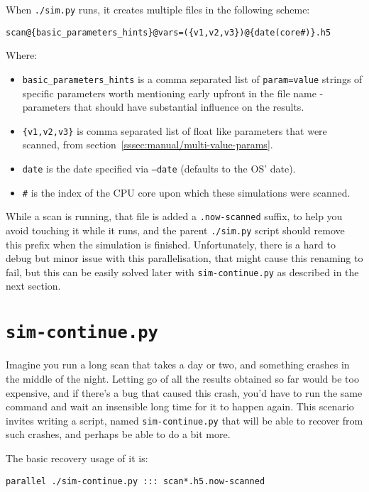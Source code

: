 When \texttt{./sim.py} runs, it creates multiple files in the following scheme:
	
\begin{verbatim}
scan@{basic_parameters_hints}@vars=({v1,v2,v3})@{date(core#)}.h5
\end{verbatim}

Where:

\begin{itemize}
	\item \texttt{basic\_parameters\_hints} is a comma separated list of \texttt{param=value} strings of specific parameters worth mentioning early upfront in the file name - parameters that should have substantial influence on the results. 
	\item \texttt{\{v1,v2,v3\}} is comma separated list of float like parameters that were scanned, from section~\ref{sssec:manual/multi-value-params}.
	\item \texttt{date} is the date specified via \texttt{--date} (defaults to the OS' date).
	\item \texttt{\#} is the index of the CPU core upon which these simulations were scanned.
\end{itemize}

While a scan is running, that file is added a \texttt{.now-scanned} suffix, to help you avoid touching it while it runs, and the parent \texttt{./sim.py} script should remove this prefix when the simulation is finished. Unfortunately, there is a hard to debug but minor issue with this parallelisation, that might cause this renaming to fail, but this can be easily solved later with \texttt{sim-continue.py} as described in the next section.

\section{\texttt{sim-continue.py}}\label{ssec:sim-continue}

Imagine you run a long scan that takes a day or two, and something crashes in the middle of the night. Letting go of all the results obtained so far would be too expensive, and if there's a bug that caused this crash, you'd have to run the same command and wait an insensible long time for it to happen again. This scenario invites writing a script, named \texttt{sim-continue.py} that will be able to recover from such crashes, and perhaps be able to do a bit more.

The basic recovery usage of it is:

\begin{verbatim}
parallel ./sim-continue.py ::: scan*.h5.now-scanned
\end{verbatim}

